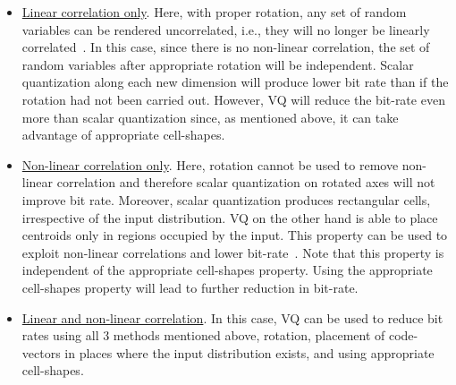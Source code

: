 \begin{Body}
\begin{enumerate}
\begin{itemize}
\item \underline{Linear correlation only}. Here, with proper rotation, any set of random variables can be rendered uncorrelated, i.e., they will no longer be linearly correlated~\cite{1985_JNL_VQ_Makhoul}.  In this case, since there is no non-linear correlation, the set of random variables after appropriate rotation will be independent.  Scalar quantization along each new dimension will produce lower bit rate than if the rotation had not been carried out.  However, VQ will reduce the bit-rate even more than scalar quantization since, as mentioned above, it can take advantage of appropriate cell-shapes.
\item \underline{Non-linear correlation only}.  Here, rotation cannot be used to remove non-linear correlation and therefore scalar quantization on rotated axes will not improve bit rate.  Moreover, scalar quantization produces rectangular cells, irrespective of the input distribution.  VQ on the other hand is able to place centroids only in regions occupied by the input.  This property can be used to exploit non-linear correlations and lower bit-rate~\cite{1985_JNL_VQ_Makhoul}.  Note that this property is independent of the appropriate cell-shapes property.  Using the appropriate cell-shapes property will lead to further reduction in bit-rate.

\item \underline{Linear and non-linear correlation}.  In this case, VQ can be used to reduce bit rates using all 3 methods mentioned above, rotation, placement of code-vectors in places where the input distribution exists, and using appropriate cell-shapes.
\end{itemize}

\end{enumerate}


\end{Body}
